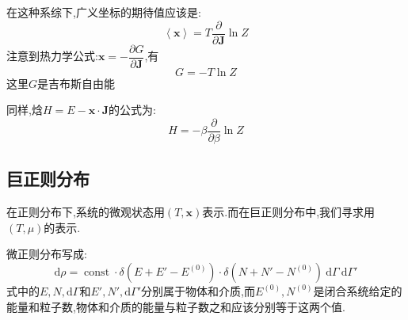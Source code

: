   在这种系综下,广义坐标的期待值应该是:
  \begin{equation}
    \left< \mathbf{x} \right> =T\dfrac{\partial }{\partial \mathbf{J}}\ln Z
  \end{equation}
  注意到热力学公式:$\mathbf{x}=-\dfrac{\partial G}{\partial \mathbf{J}}$,有
  \begin{equation}
    G=-T \ln Z
  \end{equation}
  这里$G$是吉布斯自由能
  
  同样,焓$H=E-\mathbf{x}\cdot \mathbf{J}$的公式为:
  \begin{equation}
    H=-\beta\dfrac{\partial }{\partial \beta}\ln Z
  \end{equation}


\subsection{巨正则分布}
在正则分布下,系统的微观状态用$(T,\mathbf{x})$表示.而在巨正则分布中,我们寻求用$(T,\mu)$的表示.

微正则分布写成:
\begin{equation}
    \mathrm{d} \rho = \operatorname{const} \cdot \delta(E+E'-E^{(0)})\cdot \delta(N+N'-N^{(0)})~\mathrm{d} \Gamma ~\mathrm{d} \Gamma'
\end{equation}
式中的$E,N,\mathrm{d} \Gamma$和$E',N',\mathrm{d} \Gamma'$分别属于物体和介质,而$E^{(0)},N^{(0)}$是闭合系统给定的能量和粒子数,物体和介质的能量与粒子数之和应该分别等于这两个值.

